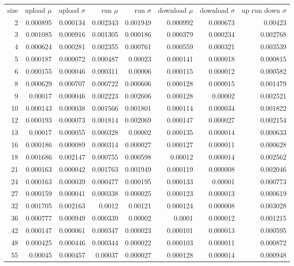 \begin{tabular}{r r r r r r r r}
size & upload $\mu$  & upload $\sigma$ & run $\mu$ & run $\sigma$ & download $\mu$ & download $\sigma$ & up run down $\sigma$ \\
2 & 0.000895 & 0.000134 & 0.002343 & 0.001949 & 0.000992 & 0.000673 & 0.00423 \\
3 & 0.001085 & 0.000916 & 0.001305 & 0.000186 & 0.000379 & 0.000234 & 0.002768 \\
4 & 0.000624 & 0.000281 & 0.002355 & 0.000761 & 0.000559 & 0.000321 & 0.003539 \\
5 & 0.000187 & 0.000072 & 0.000487 & 0.00023 & 0.000141 & 0.000018 & 0.000815 \\
6 & 0.000155 & 0.000046 & 0.000311 & 0.00006 & 0.000115 & 0.000012 & 0.000582 \\
8 & 0.000629 & 0.000707 & 0.000722 & 0.000606 & 0.000128 & 0.000015 & 0.001479 \\
9 & 0.00017 & 0.000046 & 0.002223 & 0.002606 & 0.000128 & 0.00002 & 0.002521 \\
10 & 0.000143 & 0.000038 & 0.001566 & 0.001801 & 0.000114 & 0.000034 & 0.001822 \\
12 & 0.000193 & 0.000073 & 0.001814 & 0.002069 & 0.000147 & 0.000027 & 0.002154 \\
13 & 0.00017 & 0.000055 & 0.000328 & 0.00002 & 0.000135 & 0.000014 & 0.000633 \\
16 & 0.000186 & 0.000089 & 0.000314 & 0.000027 & 0.000127 & 0.000011 & 0.000628 \\
18 & 0.001686 & 0.002147 & 0.000755 & 0.000598 & 0.00012 & 0.000014 & 0.002562 \\
21 & 0.000163 & 0.000042 & 0.001763 & 0.001949 & 0.000119 & 0.000008 & 0.002046 \\
24 & 0.000163 & 0.000039 & 0.000477 & 0.000195 & 0.000133 & 0.00001 & 0.000773 \\
27 & 0.000159 & 0.000041 & 0.000338 & 0.000025 & 0.000123 & 0.000013 & 0.000619 \\
32 & 0.001705 & 0.002163 & 0.0012 & 0.00121 & 0.000124 & 0.000008 & 0.003028 \\
36 & 0.000777 & 0.000949 & 0.000339 & 0.00002 & 0.0001 & 0.000012 & 0.001215 \\
42 & 0.000147 & 0.000061 & 0.000347 & 0.000023 & 0.000101 & 0.000013 & 0.000595 \\
48 & 0.000425 & 0.000446 & 0.000344 & 0.000022 & 0.000103 & 0.000011 & 0.000872 \\
55 & 0.00045 & 0.000457 & 0.00037 & 0.000027 & 0.000128 & 0.000014 & 0.000948 \\

\end{tabular}
